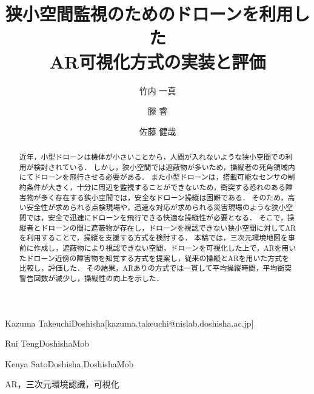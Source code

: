 \documentclass[submit, sigrecommended]{ipsj}
\begin{document}
\title{狭小空間監視のためのドローンを利用した\\ AR可視化方式の実装と評価}




\author{竹内 一真}{Kazuma Takeuchi}{Doshisha}[kazuma.takeuchi@nislab.doshisha.ac.jp]
\author{滕 睿}{Rui Teng}{DoshishaMob}
\author{佐藤 健哉}{Kenya Sato}{Doshisha,DoshishaMob}

\begin{abstract}
近年，小型ドローンは機体が小さいことから，人間が入れないような狭小空間での利用が検討されている．
しかし，狭小空間では遮蔽物が多いため，操縦者の死角領域内にてドローンを飛行させる必要がある．
また小型ドローンは，搭載可能なセンサの制約条件が大きく，十分に周辺を監視することができないため，衝突する恐れのある障害物が多く存在する狭小空間では，安全なドローン操縦は困難である．
そのため，高い安全性が求められる点検現場や，迅速な対応が求められる災害現場のような狭小空間では，安全で迅速にドローンを飛行できる快適な操縦性が必要となる．
そこで，操縦者とドローンの間に遮蔽物が存在し，ドローンを視認できない狭小空間に対してARを利用することで，操縦を支援する方式を検討する．
本稿では，三次元環境地図を事前に作成し，遮蔽物により視認できない空間，ドローンを可視化した上で，ARを用いたドローン近傍の障害物を知覚する方式を提案し，従来の操縦とARを用いた方式を比較し，評価した．
その結果，ARありの方式では一貫して平均操縦時間，平均衝突警告回数が減少し，操縦性の向上を示した．
\end{abstract}

\begin{jkeyword}
AR，三次元環境認識，可視化
\end{jkeyword}
\end{document}

